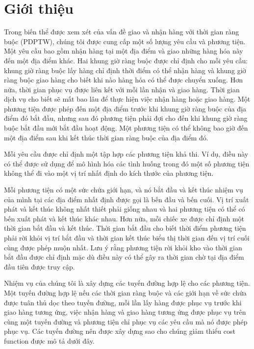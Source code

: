 \chapter*{Giới thiệu}
Trong biến thể được xem xét của vấn đề giao và nhận hàng với thời gian ràng buộc (PDPTW), chúng tôi được cung cấp một số lượng yêu cầu và phương tiện. Một yêu cầu bao gồm nhận hàng tại một địa điểm và giao những hàng hóa này đến một địa điểm khác. Hai khung giờ ràng buộc được chỉ định cho mỗi yêu cầu: khung giờ ràng buộc lấy hàng chỉ định thời điểm có thể nhận hàng và khung giờ ràng buộc giao hàng cho biết khi nào hàng hóa có thể được chuyển xuống. Hơn nữa, thời gian phục vụ được liên kết với mỗi lần nhận và giao hàng. Thời gian dịch vụ cho biết sẽ mất bao lâu để thực hiện việc nhận hàng hoặc giao hàng. Một phương tiện được phép đến một địa điểm trước khi khung giờ ràng buộc của địa điểm đó bắt đầu, nhưng sau đó phương tiện phải đợi cho đến khi khung giờ ràng buộc bắt đầu mới bắt đầu hoạt động. Một phương tiện có thể không bao giờ đến một địa điểm sau khi kết thúc thời gian ràng buộc của địa điểm đó.

Mỗi yêu cầu được chỉ định một tập hợp các phương tiện khả thi. Ví dụ, điều này có thể được sử dụng để mô hình hóa các tình huống trong đó một số phương tiện không thể đi vào một vị trí nhất định do kích thước của phương tiện.

Mỗi phương tiện có một sức chứa giới hạn, và nó bắt đầu và kết thúc nhiệm vụ của mình tại các địa điểm nhất định được gọi là bến đầu và bến cuối. Vị trí xuất phát và kết thúc không nhất thiết phải giống nhau và hai phương tiện có thể có bến xuất phát và kết thúc khác nhau.
Hơn nữa, mỗi chiếc xe được chỉ định một thời gian bắt đầu và kết thúc. Thời gian bắt đầu cho biết thời điểm phương tiện phải rời khỏi vị trí bắt đầu và thời gian kết thúc biểu thị thời gian đến vị trí cuối cùng được phép muộn nhất. Lưu ý rằng phương tiện rời khỏi kho vào thời gian bắt đầu được chỉ định mặc dù điều này có thể gây ra thời gian chờ tại địa điểm đầu tiên được truy cập.

Nhiệm vụ của chúng tôi là xây dựng các tuyến đường hợp lệ cho các phương tiện. Một tuyến đường hợp lệ nếu các thời gian ràng buộc và các giới hạn về sức chứa được tuân thủ dọc theo tuyến đường, mỗi lần lấy hàng được phục vụ trước khi giao hàng tương ứng, việc nhận hàng và giao hàng tương ứng được phục vụ trên cùng một tuyến đường và phương tiện chỉ phục vụ các yêu cầu mà nó được phép phục vụ. Các tuyến đường nên được xây dựng sao cho chúng giảm thiểu cost function được mô tả dưới đây.

